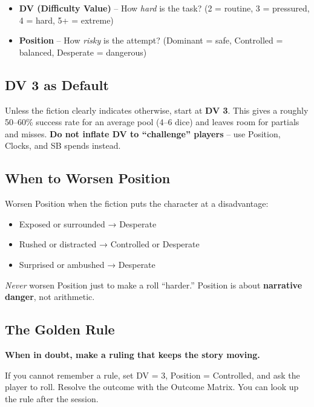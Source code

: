 \begin{itemize}
\item \textbf{DV (Difficulty Value)} – How \emph{hard} is the task? (2 = routine, 3 = pressured, 4 = hard, 5+ = extreme)
\item \textbf{Position} – How \emph{risky} is the attempt? (Dominant = safe, Controlled = balanced, Desperate = dangerous)
\end{itemize}

\subsection{DV 3 as Default}
Unless the fiction clearly indicates otherwise, start at \textbf{DV 3}. This gives a roughly 50–60\% success rate for an average pool (4–6 dice) and leaves room for partials and misses. \textbf{Do not inflate DV to “challenge” players} – use Position, Clocks, and SB spends instead.

\subsection{When to Worsen Position}
Worsen Position when the fiction puts the character at a disadvantage:
\begin{itemize}
\item Exposed or surrounded → Desperate
\item Rushed or distracted → Controlled or Desperate
\item Surprised or ambushed → Desperate
\end{itemize}
\emph{Never} worsen Position just to make a roll “harder.” Position is about \textbf{narrative danger}, not arithmetic.

\subsection{The Golden Rule}
\begin{tcolorbox}[colback=yellow!5,colframe=yellow!75!black,title={Golden Rule}]
\textbf{When in doubt, make a ruling that keeps the story moving.}

If you cannot remember a rule, set DV = 3, Position = Controlled, and ask the player to roll. Resolve the outcome with the Outcome Matrix. You can look up the rule after the session.
\end{tcolorbox}

